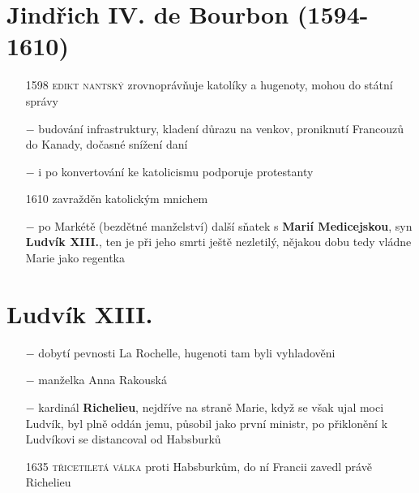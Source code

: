 \documentclass{article}
\begin{document}
\section*{Jindřich IV. de Bourbon (1594-1610)}
\begin{itemize}
    \vspace{-0.5em}
    \setlength\itemsep{0.15em}
    \item[1598] \textsc{edikt nantský} zrovnoprávňuje katolíky a hugenoty, mohou do státní správy
    \item[$-$] budování infrastruktury, kladení důrazu na venkov, proniknutí Francouzů do Kanady, dočasné snížení daní
    \item[$-$] i po konvertování ke katolicismu podporuje protestanty
    \item[1610] zavražděn katolickým mnichem
    \item[$-$] po Markétě (bezdětné manželství) další sňatek s \textbf{Marií Medicejskou}, syn \textbf{Ludvík XIII.}, ten je při jeho smrti ještě nezletilý, nějakou dobu tedy vládne Marie jako regentka
\end{itemize}


\section*{Ludvík XIII.}
\begin{itemize}
    \vspace{-0.5em}
    \setlength\itemsep{0.15em}
    \item[$-$] dobytí pevnosti La Rochelle, hugenoti tam byli vyhladověni
    \item[$-$] manželka Anna Rakouská
    \item[$-$] kardinál \textbf{Richelieu}, nejdříve na straně Marie, když se však ujal moci Ludvík, byl plně oddán jemu, působil jako první ministr, po přiklonění k Ludvíkovi se distancoval od Habsburků
    \item[1635] \textsc{třicetiletá válka} proti Habsburkům, do ní Francii zavedl právě Richelieu
\end{itemize}
\end{document}
